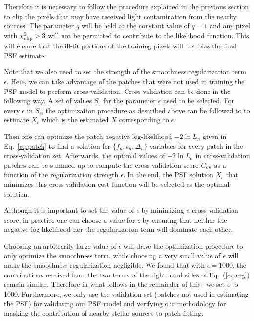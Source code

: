 Therefore it is necessary to follow the procedure explained in the previous section to clip the pixels that may have received light 
contamination from the nearby sources. The parameter $q$ will be held at the constant value of $q=1$ and any pixel with $\chi^{2}_{\rm clip} > 3 $ 
will not be permitted to contribute to the likelihood function. 
This will ensure that the ill-fit portions of the training pixels will not bias the final PSF estimate. 

Note that we also need to set the strength of the smoothness regularization term $\epsilon$. Here, we can take advantage of the patches that were not used 
in training the PSF model to perform cross-validation. Cross-validation can be done in the following way. A set of values $S_{\epsilon}$ for the parameter $\epsilon$ need to be selected. For every $\epsilon$ in $S_{\epsilon}$, the optimization procedure as described above can be followed to to estimate $X_{\epsilon}$ which is the estimated $X$ corresponding to $\epsilon$. 

Then one can optimize the patch negative log-likelihood $-2\ln L_n$ given in Eq.~\ref{eq:patch} to find a solution for $\{f_n,b_n,\Delta_n\}$
variables for every patch in the cross-validation set. Afterwards, the optimal values of $-2\ln L_n$ in cross-validation patches can be summed up to 
compute the cross-validation score $C_{\rm cv}$ as a function of the regularization strength $\epsilon$.
In the end, the PSF solution $X_{\epsilon}$ that minimizes this cross-validation cost function will be selected as the optimal solution.

Although it is important to set the value of $\epsilon$ by minimizing a cross-validation score, in practice one can choose a 
value for $\epsilon$ by ensuring that neither the negative log-likelihood nor the regularization term will dominate each other. 

Choosing an arbitrarily large value of $\epsilon$ will drive the optimization procedure to only optimize the smoothness term, while choosing a very small 
value of $\epsilon$ will make the smoothness regularization negligible. We found that with $\epsilon = 1000$, the contributions received from the two terms 
of the right hand sides of Eq.~(\ref{eq:reg}) remain similar. Therefore in what follows in the remainder of this \paper\ we set $\epsilon$  to 1000.
Furthermore, we only use the validation set (patches not used in estimating the PSF) for validating our PSF model and verifying our 
methodology for masking the contribution of nearby stellar sources to patch fitting.  

